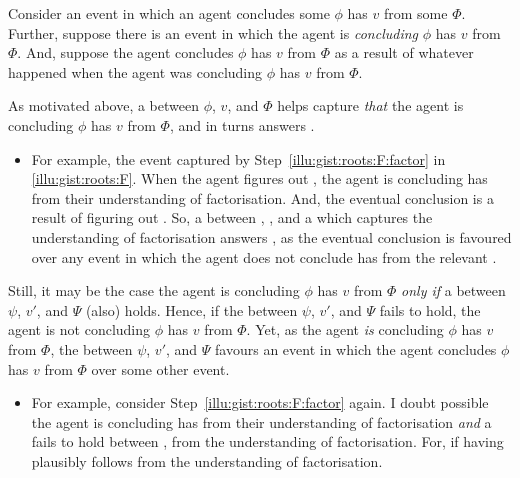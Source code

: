 \begin{note}
  Consider an event in which an agent concludes some  \(\phi\) has \val{} \(v\) from some \pool{} \(\Phi\).
  Further, suppose there is an event in which the agent is \emph{concluding} \(\phi\) has \val{} \(v\) from \(\Phi\).
  And, suppose the agent concludes \(\phi\) has \val{} \(v\) from \(\Phi\) as a result of whatever happened when the agent was concluding \(\phi\) has \val{} \(v\) from \(\Phi\).

  As motivated above, a \ros{} between \(\phi\), \(v\), and \(\Phi\) helps capture \emph{that} the agent is concluding \(\phi\) has  \(v\) from \(\Phi\), and in turns answers \qWhy{}.
  \begin{itemize}
  \item
    For example, the event captured by Step~\ref{illu:gist:roots:F:factor} in \autoref{illu:gist:roots:F}.
    When the agent figures out \rootsConEqFac{}, the agent is concluding \propI{\rootsCon{}} has   from their understanding of factorisation.
    And, the eventual conclusion is a result of figuring out \rootsConEqFac{}.
    So, a \ros{} between \propI{\rootsCon{}}, , and a \pool{} which captures the \agents{} understanding of factorisation answers \qWhy{}, as the \agents{} eventual conclusion is favoured over any event in which the agent does not conclude \propI{\rootsCon{}} has   from the relevant \pool{}.
  \end{itemize}
  Still, it may be the case the agent is concluding \(\phi\) has  \(v\) from \(\Phi\) \emph{only if} a \ros{} between \(\psi\), \(v'\), and \(\Psi\) (also) holds.
  Hence, if the \ros{} between \(\psi\), \(v'\), and \(\Psi\) fails to hold, the agent is not concluding \(\phi\) has  \(v\) from \(\Phi\).
  Yet, as the agent \emph{is} concluding \(\phi\) has  \(v\) from \(\Phi\), the \ros{} between \(\psi\), \(v'\), and \(\Psi\) favours an event in which the agent concludes \(\phi\) has  \(v\) from \(\Phi\) over some other event.
  \begin{itemize}
  \item
    For example, consider Step~\ref{illu:gist:roots:F:factor} again.
    I doubt possible the agent is concluding \propI{\rootsCon{}} has   from their understanding of factorisation \emph{and} a \ros{} fails to hold between \propI{\rootsSimp{}},   from the \agents{} understanding of factorisation.
    For, if \propI{\rootsSimp{}} having   plausibly follows from the \agents{} understanding of factorisation.

\end{itemize}
\end{note}
